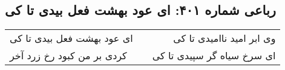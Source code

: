 \begin{center}
\section*{رباعی شماره ۴۰۱: ای عود بهشت فعل بیدی تا کی}
\label{sec:sh401}
\begin{longtable}{l p{0.5cm} r}
ای عود بهشت فعل بیدی تا کی
&&
وی ابر امید ناامیدی تا کی
\\
کردی بر من کبود رخ زرد آخر
&&
ای سرخ سیاه گر سپیدی تا کی
\\
\end{longtable}
\end{center}
